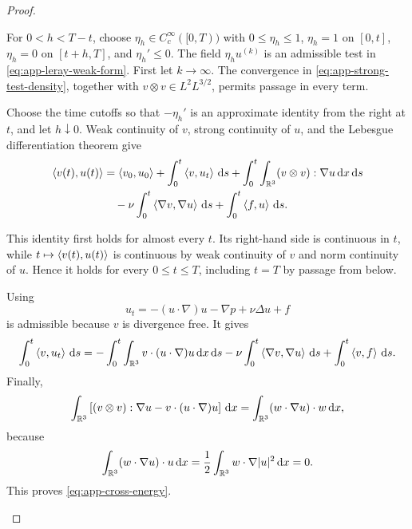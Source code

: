 \begin{proof}
\begin{samepage}
For \(0<h<T-t\), choose \(\eta_h\in C_c^\infty([0,T))\) with
\(0\le\eta_h\le1\), \(\eta_h=1\) on \([0,t]\),
\(\eta_h=0\) on \([t+h,T]\), and \(\eta_h'\le0\).  The field
\(\eta_hu^{(k)}\) is an admissible test in
\eqref{eq:app-leray-weak-form}.  First let \(k\to\infty\).
The convergence in \eqref{eq:app-strong-test-density}, together with
\(v\otimes v\in L^2L^{3/2}\), permits passage in every term.
\par
\end{samepage}
\begin{samepage}
Choose the time cutoffs so that \(-\eta_h'\) is an approximate identity from the right
at \(t\), and let \(h\downarrow0\).  Weak continuity of \(v\), strong
continuity of \(u\), and the Lebesgue differentiation theorem give
\begin{align*}
 \left\langle v(t),u(t)\right\rangle
 &=
 \left\langle v_0,u_0\right\rangle
 +\int_0^t\left\langle v,u_t\right\rangle\,\mathrm d s
 +\int_0^t\int_{\mathbb R^3}(v\otimes v):\nabla u\,\mathrm d x\,\mathrm d s\\
 &\quad-\nu\int_0^t\left\langle \nabla v,\nabla u\right\rangle\,\mathrm d s
 +\int_0^t\left\langle f,u\right\rangle\,\mathrm d s.
\end{align*}
\par
\end{samepage}
This identity first holds for almost every \(t\).  Its right-hand side is
continuous in \(t\), while \(t\mapsto\left\langle v(t),u(t)\right\rangle\) is continuous by
weak continuity of \(v\) and norm continuity of \(u\).  Hence it holds for
every \(0\le t\le T\), including \(t=T\) by passage from below.
\begin{samepage}
Using
\[
 u_t=-(u\cdot\nabla)u-\nabla p+\nu\Delta u+f
\]
is admissible because \(v\) is divergence free.  It gives
\[
 \int_0^t\left\langle v,u_t\right\rangle\,\mathrm d s
 =
 -\int_0^t\int_{\mathbb R^3}v\cdot(u\cdot\nabla)u\,\mathrm d x\,\mathrm d s
 -\nu\int_0^t\left\langle \nabla v,\nabla u\right\rangle\,\mathrm d s
 +\int_0^t\left\langle v,f\right\rangle\,\mathrm d s.
\]
Finally,
\[
 \int_{\mathbb R^3}
 \left[(v\otimes v):\nabla u-v\cdot(u\cdot\nabla)u\right]\,\mathrm d x
 =
 \int_{\mathbb R^3}(w\cdot\nabla u)\cdot w\,\mathrm d x,
\]
because
\[
 \int_{\mathbb R^3}(w\cdot\nabla u)\cdot u\,\mathrm d x
 =\frac12\int_{\mathbb R^3}w\cdot\nabla|u|^2\,\mathrm d x=0.
\]
This proves \eqref{eq:app-cross-energy}.
\end{samepage}
\end{proof}

